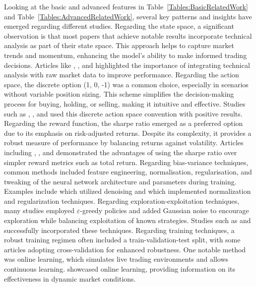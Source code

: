 Looking at the basic and advanced features in Table~\ref{Tables:BasicRelatedWork} and Table~\ref{Tables:AdvancedRelatedWork}, several key patterns and insights have emerged regarding different studies. Regarding the state space, a significant observation is that most papers that achieve notable results incorporate technical analysis as part of their state space. This approach helps to capture market trends and momentum, enhancing the model's ability to make informed trading decisions. Articles like \cite{carapuco_reinforcement_2018}, \cite{huang_financial_2018}, and \cite{yang_deep_2020} highlighted the importance of integrating technical analysis with raw market data to improve performance. Regarding the action space, the discrete option (1, 0, -1) was a common choice, especially in scenarios without variable position sizing. This scheme simplifies the decision-making process for buying, holding, or selling, making it intuitive and effective. Studies such as \cite{rundo_deep_2019}, \cite{saini_stock_2019}, and \cite{xiong_practical_2018} used this discrete action space convention with positive results. Regarding the reward function, the sharpe ratio emerged as a preferred option due to its emphasis on risk-adjusted returns. Despite its complexity, it provides a robust measure of performance by balancing returns against volatility. Articles including \cite{kong_empirical_2023}, \cite{sagiraju_application_2021}, and \cite{jia_lstm-ddpg_2021} demonstrated the advantages of using the sharpe ratio over simpler reward metrics such as total return. Regarding bias-variance techniques, common methods included feature engineering, normalisation, regularisation, and tweaking of the neural network architecture and parameters during training. Examples include \cite{li_deep_2019} which utilized denoising and \cite{theate_application_2021} which implemented normalization and regularization techniques. Regarding exploration-exploitation techniques, many studies employed \(\varepsilon\)-greedy policies and added Gaussian noise to encourage exploration while balancing exploitation of known strategies. Studies such as \cite{wu_adaptive_2020} and \cite{majidi_algorithmic_2022} successfully incorporated these techniques. Regarding training techniques, a robust training regimen often included a train-validation-test split, with some articles adopting cross-validation for enhanced robustness. One notable method was online learning, which simulates live trading environments and allows continuous learning. \cite{huang_financial_2018} showcased online learning, providing information on its effectiveness in dynamic market conditions.



